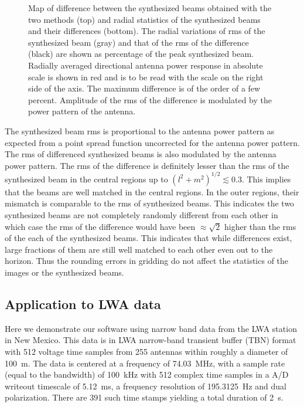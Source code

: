 \documentclass[a4paper,fleqn,usenatbib]{mnras}
\begin{document}
\begin{figure}
  \caption{Map of difference between the synthesized beams obtained with the 
    two methods (top) and radial statistics of the synthesized beams and 
    their differences (bottom). The radial variations of rms of the synthesized 
    beam (gray) and that of the rms of the difference (black) are shown as 
    percentage of the peak synthesized beam. Radially averaged directional 
    antenna power response in absolute scale is shown in red and is to be read 
    with the scale on the right side of the axis. The maximum difference is of 
    the order of a few percent. Amplitude of the rms of the difference is 
    modulated by the power pattern of the antenna.}
  \label{fig:psf-diff}
\end{figure}

The synthesized beam rms is proportional to the antenna power pattern as 
expected from a point spread function uncorrected for the antenna power pattern. 
The rms of differenced synthesized beams is also modulated by the antenna power 
pattern. The rms of the difference is definitely lesser than the rms of the 
synthesized beam in the central regions up to $(l^2+m^2)^{1/2}\lesssim 0.3$. This 
implies that the beams are well matched in the central regions. In the outer 
regions, their mismatch is comparable to the rms of synthesized beams. This 
indicates the two synthesized beams are not completely randomly different from 
each other in which case the rms of the difference would have been 
$\approx \sqrt{2}$ higher than the rms of the each of the synthesized beams. 
This indicates that while differences exist, large fractions of them are still 
well matched to each other even out to the horizon. Thus the rounding errors in 
gridding do not affect the statistics of the images or the synthesized beams.

\subsection{Application to LWA data}\label{sec:LWA-data}

Here we demonstrate our software using narrow band data from the LWA station 
in New Mexico. This data is in LWA narrow-band transient buffer (TBN) format with 
512 voltage time samples from 255 antennas within roughly a diameter of 100~m. 
The data is centered at a frequency of 74.03~MHz, with a sample rate (equal to 
the bandwidth) of 100~kHz with 512 complex time samples in a A/D writeout 
timescale of 5.12~ms, a frequency resolution of 195.3125~Hz and dual 
polarization. There are 391 such time stamps yielding a total duration of 2~s. 
\end{document}
